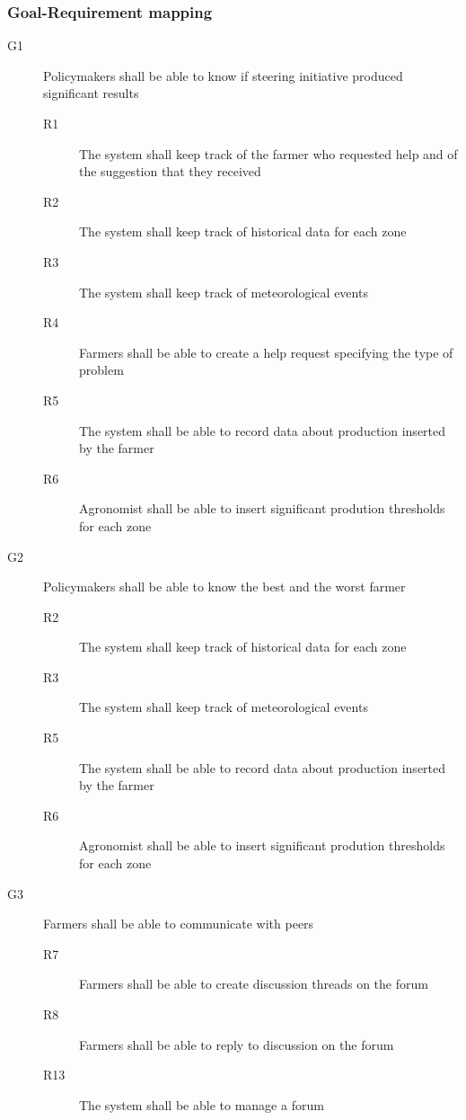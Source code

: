 \subsubsection{Goal-Requirement mapping}
\begin{description}
    \item [G1] Policymakers shall be able to know if steering initiative produced significant results
        \begin{description}
            \item[R1] The system shall keep track of the farmer who requested help and of the suggestion that they received
            \item[R2] The system shall keep track of historical data for each zone
            \item[R3] The system shall keep track of meteorological events
            \item[R4] Farmers shall be able to create a help request specifying  the type of problem
            \item[R5] The system shall be able to record data about production inserted by the farmer
            \item[R6] Agronomist shall be able to insert significant prodution thresholds for each zone   
        \end{description}
    \item [G2] Policymakers shall be able to know the best and the worst farmer
        \begin{description}
            \item[R2] The system shall keep track of historical data for each zone
            \item[R3] The system shall keep track of meteorological events
            \item[R5] The system shall be able to record data about production inserted by the farmer
            \item[R6] Agronomist shall be able to insert significant prodution thresholds for each zone   
        \end{description}
    \item [G3] Farmers shall be able to communicate with peers
        \begin{description}
            \item[R7] Farmers shall be able to create discussion threads on the forum
            \item[R8] Farmers shall be able to reply to discussion on the forum
            \item[R13] The system shall be able to manage a forum

\end{description}
\end{description}
